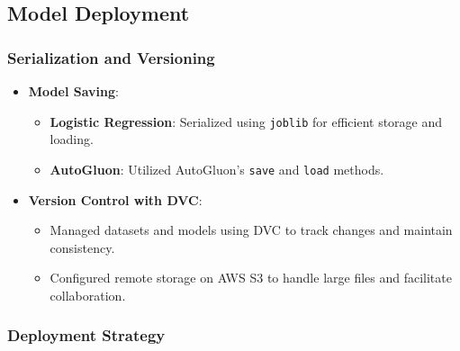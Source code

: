 \documentclass{article}
\begin{document}


\subsection{Model Deployment}

\subsubsection{Serialization and Versioning}

\begin{itemize}[leftmargin=*]
    \item \textbf{Model Saving}:
        \begin{itemize}[leftmargin=*]
            \item \textbf{Logistic Regression}: Serialized using \texttt{joblib} for efficient storage and loading.
            \item \textbf{AutoGluon}: Utilized AutoGluon's \texttt{save} and \texttt{load} methods.
        \end{itemize}
    \item \textbf{Version Control with DVC}:
        \begin{itemize}[leftmargin=*]
            \item Managed datasets and models using DVC to track changes and maintain consistency.
            \item Configured remote storage on AWS S3 to handle large files and facilitate collaboration.
        \end{itemize}
\end{itemize}

\subsubsection{Deployment Strategy}
\end{document}
